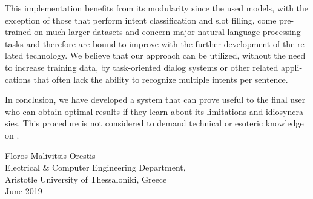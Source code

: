 \begin{english}
This implementation benefits from its modularity since the used models, with the exception of those that perform intent classification and slot filling,
come pre-trained on much larger datasets and concern major natural language processing tasks and therefore are bound to improve with the further development of the related technology.
We believe that our approach can be utilized, without the need to increase training data, by task-oriented dialog systems or other related applications that often lack the ability to recognize multiple intents per sentence.

In conclusion, we have developed a system that can prove useful to the final user who can obtain optimal results if they learn about its limitations and idiosyncrasies.
This procedure is not considered to demand technical or esoteric knowledge on \projectname{}.

\begin{flushright}
    \vspace*{\fill}%
    Floros-Malivitsis Orestis\\
    Electrical \& Computer Engineering Department,\\
    Aristotle University of Thessaloniki, Greece\\
    June 2019
\end{flushright}
\end{english}

